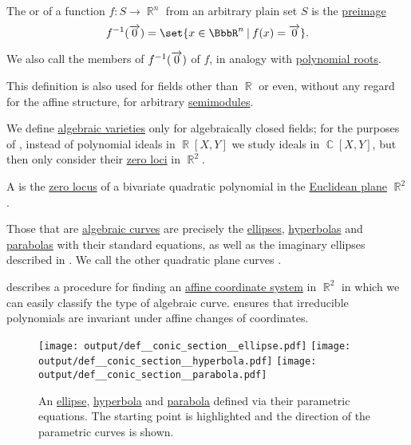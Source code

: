 \begin{definition}\label{def:zero_locus}\mimprovised
  The  or  of a function \( f: S \to \BbbR^n \) from an arbitrary plain set \( S \) is the \hyperref[thm:def:function/preimage]{preimage}
  \begin{equation*}
    f^{-1}(\vect 0) = \set{ x \in \BbbR^n \given f(x) = \vect 0 }.
  \end{equation*}

  We also call the members of \( f^{-1}(\overrightarrow{0}) \)  of \( f \), in analogy with \hyperref[def:polynomial_root]{polynomial roots}.

  This definition is also used for fields other than \( \BbbR \) or even, without any regard for the affine structure, for arbitrary \hyperref[def:semimodule]{semimodules}.
\end{definition}

\begin{remark}\label{rem:real_affine_varieties}
  We define \hyperref[def:affine_algebraic_set/varieties]{algebraic varieties} only for algebraically closed fields; for the purposes of , instead of polynomial ideals in \( \BbbR[X, Y] \) we study ideals in \( \BbbC[X, Y] \), but then only consider their \hyperref[def:zero_locus]{zero loci} in \( \BbbR^2 \).
\end{remark}

\begin{definition}\label{def:quadratic_plane_curve}\mimprovised
  A  is the \hyperref[def:zero_locus]{zero locus} of a bivariate quadratic polynomial in the \hyperref[def:euclidean_plane]{Euclidean plane} \( \BbbR^2 \).

  Those that are \hyperref[def:affine_algebraic_set/curve]{algebraic curves} are precisely the \hyperref[def:ellipse]{ellipses}, \hyperref[def:hyperbola]{hyperbolas} and \hyperref[def:parabola]{parabolas} with their standard equations, as well as the imaginary ellipses described in . We call the other quadratic plane curves .

   describes a procedure for finding an \hyperref[def:affine_coordinate_system]{affine coordinate system} in \( \BbbR^2 \) in which we can easily classify the type of algebraic curve.  ensures that irreducible polynomials are invariant under affine changes of coordinates.

  \begin{figure}[!ht]
    \hfill
    \hfill
    \texttt{[image: output/def\_\_conic\_section\_\_ellipse.pdf]}
    \hfill
    \texttt{[image: output/def\_\_conic\_section\_\_hyperbola.pdf]}
    \hfill
    \texttt{[image: output/def\_\_conic\_section\_\_parabola.pdf]}
    \hfill
    \caption{An \hyperref[def:ellipse]{ellipse}, \hyperref[def:hyperbola]{hyperbola} and \hyperref[def:parabola]{parabola} defined via their parametric equations. The starting point is highlighted and the direction of the parametric curves is shown.}\label{fig:def:quadratic_plane_curve}
  \end{figure}
\end{definition}

